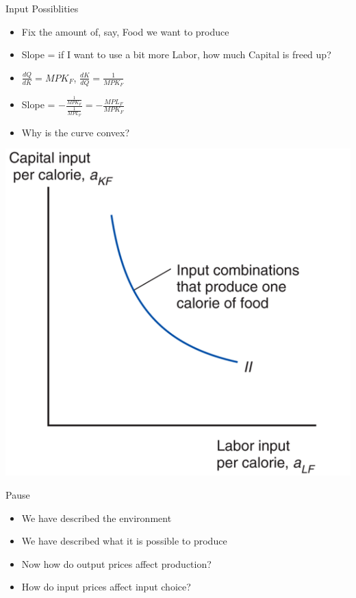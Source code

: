\documentclass[ignorenonframetext,]{beamer}
\begin{document}
\begin{frame}{Input Possiblities}

    \begin{itemize}
        \item Fix the amount of, say, Food we want to produce 
        \item Slope = if I want to use a bit more Labor, how much Capital is freed up? 
        \item $\frac{dQ}{dK} = MPK_F$, $\frac{dK}{dQ} = \frac{1}{MPK_F}$
        \item Slope = $-\frac{\frac{1}{MPK_F}}{\frac{1}{MPL_F}} = -\frac{MPL_F}{MPK_F}$ 
        \item Why is the curve convex?
    \end{itemize}
    \includegraphics[scale=0.15]{input_poss.png}

\end{frame}

\begin{frame}{Pause}

    \begin{itemize}
        \item We have described the environment
        \item We have described what it is possible to produce
        \item Now how do output prices affect production?
        \item How do input prices affect input choice?
    \end{itemize}

\end{frame}
\end{document}
